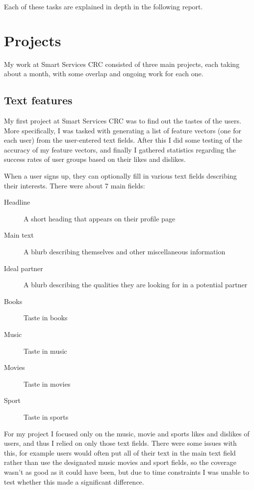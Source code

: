 \documentclass{report}
\begin{document}
Each of these tasks are explained in depth in the following report.


\chapter{Projects}
My work at Smart Services CRC consisted of three main projects, each taking about a month, with some overlap and ongoing work for each one.

\section{Text features}

My first project at Smart Services CRC was to find out the tastes of the users. More specifically, I was tasked with generating a list of feature vectors (one for each user) from the user-entered text fields. After this I did some testing of the accuracy of my feature vectors, and finally I gathered statistics regarding the success rates of user groups based on their likes and dislikes.

When a user signs up, they can optionally fill in various text fields describing their interests. There were about 7 main fields:
\begin{description}
  \item[Headline] A short heading that appears on their profile page
  \item[Main text] A blurb describing themselves and other miscellaneous information
  \item[Ideal partner] A blurb describing the qualities they are looking for in a potential partner
  \item[Books] Taste in books
  \item[Music] Taste in music
  \item[Movies] Taste in movies
  \item[Sport] Taste in sports
\end{description}

For my project I focused only on the music, movie and sports likes and dislikes of users, and thus I relied on only those text fields. There were some issues with this, for example users would often put all of their text in the main text field rather than use the designated music movies and sport fields, so the coverage wasn't as good as it could have been, but due to time constraints I was unable to test whether this made a significant difference.
\end{document}

